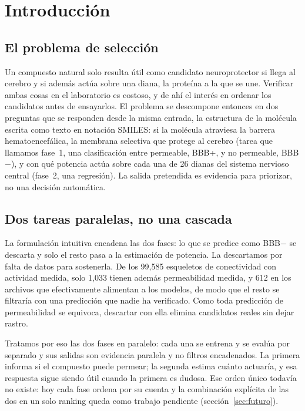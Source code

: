 \documentclass[twocolumn,10pt,letterpaper]{article}
\begin{document}
\section{Introducción}

\subsection{El problema de selección}

Un compuesto natural solo resulta útil como candidato neuroprotector si llega al cerebro y si además actúa sobre una diana, la proteína a la que se une. Verificar ambas cosas en el laboratorio es costoso, y de ahí el interés en ordenar los candidatos antes de ensayarlos. El problema se descompone entonces en dos preguntas que se responden desde la misma entrada, la estructura de la molécula escrita como texto en notación SMILES: si la molécula atraviesa la barrera hematoencefálica, la membrana selectiva que protege al cerebro (tarea que llamamos fase~1, una clasificación entre permeable, BBB+, y no permeable, BBB$-$), y con qué potencia actúa sobre cada una de 26 dianas del sistema nervioso central (fase~2, una regresión). La salida pretendida es evidencia para priorizar, no una decisión automática.

\subsection{Dos tareas paralelas, no una cascada}

La formulación intuitiva encadena las dos fases: lo que se predice como BBB$-$ se descarta y solo el resto pasa a la estimación de potencia. La descartamos por falta de datos para sostenerla. De los 99,585 esqueletos de conectividad con actividad medida, solo 1,033 tienen además permeabilidad medida, y 612 en los archivos que efectivamente alimentan a los modelos, de modo que el resto se filtraría con una predicción que nadie ha verificado. Como toda predicción de permeabilidad se equivoca, descartar con ella elimina candidatos reales sin dejar rastro.

Tratamos por eso las dos fases en paralelo: cada una se entrena y se evalúa por separado y sus salidas son evidencia paralela y no filtros encadenados. La primera informa si el compuesto puede permear; la segunda estima cuánto actuaría, y esa respuesta sigue siendo útil cuando la primera es dudosa. Ese orden único todavía no existe: hoy cada fase ordena por su cuenta y la combinación explícita de las dos en un solo ranking queda como trabajo pendiente (sección~\ref{sec:futuro}).
\end{document}
